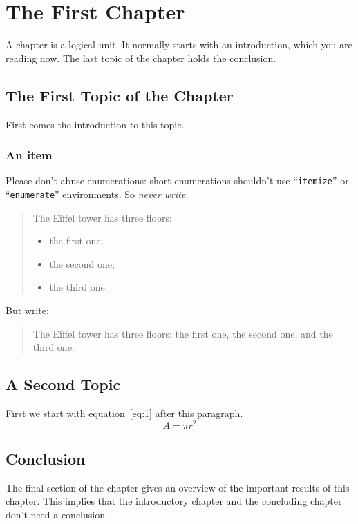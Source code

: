 \chapter{The First Chapter}
\label{cha:1}
A chapter is a logical unit. It normally starts with an introduction, which
you are reading now. The last topic of the chapter holds the conclusion.

\section{The First Topic of the Chapter}
First comes the introduction to this topic.


\subsection{An item}
Please don't abuse enumerations: short enumerations shouldn't use
``\verb|itemize|'' or ``\texttt{enumerate}'' environments.
So \emph{never write}: 
\begin{quote}
  The Eiffel tower has three floors:
  \begin{itemize}
  \item the first one;
  \item the second one;
  \item the third one.
  \end{itemize}
\end{quote}
But write:
\begin{quote}
  The Eiffel tower has three floors: the first one, the second one, and the
  third one.
\end{quote}

\section{A Second Topic}
First we start with equation~\ref{eq:1} after this paragraph.
\begin{equation}
  \label{eq:1}
  A = \pi r^2
\end{equation}





\section{Conclusion}
The final section of the chapter gives an overview of the important results
of this chapter. This implies that the introductory chapter and the
concluding chapter don't need a conclusion.


